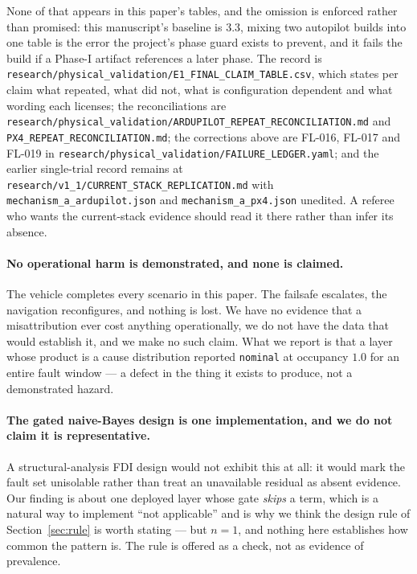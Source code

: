 \documentclass[11pt,a4paper]{article}
\newcommand{\code}[1]{\texttt{\small #1}}
\begin{document}
None of that appears in this paper's tables, and the omission is enforced
rather than promised: this manuscript's baseline is 3.3, mixing two autopilot
builds into one table is the error the project's phase guard exists to prevent,
and it fails the build if a Phase-I artifact references a later phase. The
record is \code{research/physical\_validation/E1\_FINAL\_CLAIM\_TABLE.csv},
which states per claim what repeated, what did not, what is configuration
dependent and what wording each licenses; the reconciliations are
\code{research/physical\_validation/ARDUPILOT\_REPEAT\_RECONCILIATION.md} and
\code{PX4\_REPEAT\_RECONCILIATION.md}; the corrections above are FL-016,
FL-017 and FL-019 in
\code{research/physical\_validation/FAILURE\_LEDGER.yaml}; and the earlier
single-trial record remains at
\code{research/v1\_1/CURRENT\_STACK\_REPLICATION.md} with
\code{mechanism\_a\_ardupilot.json} and \code{mechanism\_a\_px4.json}
unedited. A referee who wants the current-stack evidence should read it there
rather than infer its absence.

\paragraph{No operational harm is demonstrated, and none is claimed.} The
vehicle completes every scenario in this paper. The failsafe escalates, the
navigation reconfigures, and nothing is lost. We have no evidence that a
misattribution ever cost anything operationally, we do not have the data that
would establish it, and we make no such claim. What we report is that a layer
whose product is a cause distribution reported \code{nominal} at occupancy
$1.0$ for an entire fault window --- a defect in the thing it exists to
produce, not a demonstrated hazard.

\paragraph{The gated naive-Bayes design is one implementation, and we do not
claim it is representative.} A structural-analysis FDI design would not exhibit
this at all: it would mark the fault set unisolable rather than treat an
unavailable residual as absent evidence. Our finding is about one deployed
layer whose gate \emph{skips} a term, which is a natural way to implement ``not
applicable'' and is why we think the design rule of
Section~\ref{sec:rule} is worth stating --- but $n=1$, and nothing here
establishes how common the pattern is. The rule is offered as a check, not as
evidence of prevalence.
\end{document}
